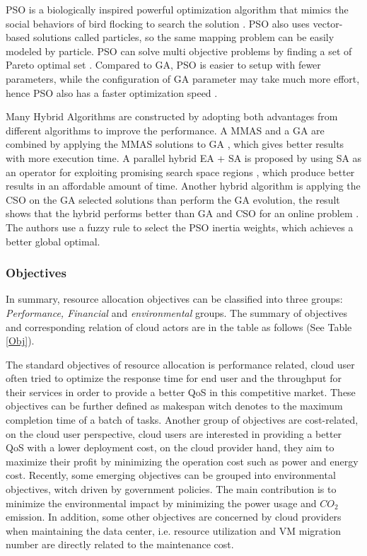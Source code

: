 \documentclass[onecolumn,10pt]{asme2ej}
\begin{document}
PSO is a biologically inspired powerful optimization algorithm that mimics the social behaviors of bird flocking to search the solution \cite{kennedy2011particle}. PSO also uses vector-based solutions called particles, so the same mapping problem can be easily modeled by particle. PSO can solve multi objective problems by finding a set of Pareto optimal set \cite{reyes2006multi}. Compared to GA, PSO is easier to setup with fewer parameters, while the configuration of GA parameter may take much more effort, hence PSO also has a faster optimization speed \cite{bai2010analysis}. 

Many Hybrid Algorithms are constructed by adopting both advantages from different algorithms to improve the performance. A MMAS and a GA are combined by applying the MMAS solutions to GA \cite{hajjem2016mmas}, which gives better results with more execution time. A parallel hybrid EA + SA is proposed by using SA as an operator for exploiting promising search space regions \cite{iturriaga2013parallel}, which produce better results in an affordable amount of time. Another hybrid algorithm is applying the CSO on the GA selected solutions than perform the GA evolution, the result shows that the hybrid performs better than GA and CSO for an online problem \cite{sharma2016demand}. The authors \cite{ramezani2016multi} use a fuzzy rule to select the PSO inertia weights, which achieves a better global optimal.

\subsubsection{Objectives}
In summary, resource allocation objectives can be classified into three groups: \emph{Performance, Financial} and \emph{environmental} groups. The summary of objectives and corresponding relation of cloud actors are in the table as follows (See Table \ref{Obj}).

The standard objectives of resource allocation is performance related, cloud user often tried to optimize the response time for end user and the throughput for their services in order to provide a better QoS in this competitive market. These objectives can be further defined as makespan witch denotes to the maximum completion time of a batch of tasks. Another group of objectives are cost-related, on the cloud user perspective, cloud users are interested in providing a better QoS with a lower deployment cost, on the cloud provider hand, they aim to maximize their profit by minimizing the operation cost such as power and energy cost. Recently, some emerging objectives can be grouped into environmental objectives, witch driven by government policies. The main contribution is to minimize the environmental impact by minimizing the power usage and $CO_2$ emission. In addition, some other objectives are concerned by cloud providers when maintaining the data center, i.e. resource utilization and VM migration number are directly related to the maintenance cost.
\end{document}
